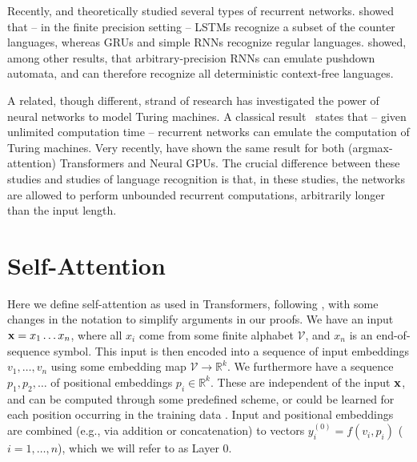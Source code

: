 \documentclass[11pt,a4paper]{article}
\begin{document}
Recently, \citet{merrill2019sequential} and \citet{korsky2019computational} theoretically studied several types of recurrent networks. \citet{merrill2019sequential} showed that -- in the finite precision setting -- LSTMs recognize a subset of the counter languages, whereas GRUs and simple RNNs recognize regular languages.
\citet{korsky2019computational} showed, among other results, that arbitrary-precision RNNs can emulate pushdown automata, and can therefore recognize all deterministic context-free languages.


A related, though different, strand of research has investigated the power of neural networks to model Turing machines.
A classical result~\cite{siegelman1991neural} states that -- given unlimited computation time -- recurrent networks can emulate the computation of Turing machines.
Very recently, \citet{perez2019turing} have shown the same result for both (argmax-attention) Transformers and Neural GPUs.
The crucial difference between these studies and studies of language recognition is that, in these studies, the networks are allowed to perform unbounded recurrent computations, arbitrarily longer than the input length.

\section{Self-Attention}\label{sec:def-selfatt}
Here we define self-attention as used in Transformers, following \citet{vaswani2017attention}, with some changes in the notation to simplify arguments in our proofs.
We have an input ${\bf x} = x_1 \dots x_n$, where all $x_i$ come from some finite alphabet $\mathcal{V}$, and $x_n$ is an end-of-sequence symbol.
This input is then encoded into a sequence of input embeddings $v_1,\dots,v_n$ using some embedding map $\mathcal{V} \rightarrow \mathbb{R}^k$. %
We furthermore have a sequence $p_1, p_2, \dots$ of positional embeddings $p_i \in \mathbb{R}^k$. These are independent of the input ${\bf x}$, and can be computed through some predefined scheme, or could be learned for each position occurring in the training data \citep{vaswani2017attention}.
Input and positional embeddings are combined (e.g., via addition or concatenation) to vectors $y_i^{(0)} = f(v_i, p_i)$ ($i=1, \dots, n$), which we will refer to as Layer 0.
\end{document}

